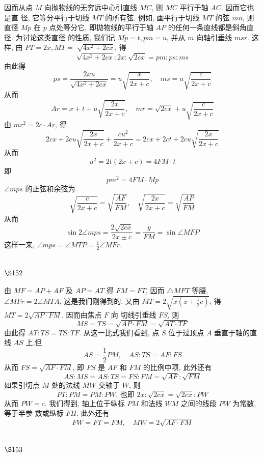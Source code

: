 因而从点 $M$ 向抛物线的无穷远中心引直线 $M C$, 则 $M C$ 平行于轴 $A C$. 因而它也是直 径, 它等分平行于切线 $M T$ 的所有弦. 例如, 画平行于切线 $M T$ 的弦 $m n$, 则直径 $M p$ 在 $p$ 点处等分它, 即拋物线的平行于轴 $A P$ 的任何一条直线都是斜角直径. 为讨论这类直径 的性质, 我们记 $M p=t, p m=u$, 并从 $m$ 向轴引垂线 $m s r$. 这样, 由 $P T=2 x, M T=$ $\sqrt{4 x^{2}+2 c x}$, 得
\[
\sqrt{4 x^{2}+2 c x}: 2 x: \sqrt{2 c x}=p m: p s: m s
\]
由此得
\[
p s=\frac{2 x u}{\sqrt{4 x^{2}+2 c x}}=u \sqrt{\frac{x}{2 x+c}}, \quad m s=u \sqrt{\frac{c}{2 x+c}}
\]
从而
\[
A r=x+t+u \sqrt{\frac{2 x}{2 x+c}}, \quad m r=\sqrt{2 c x}+u \sqrt{\frac{c}{2 x+c}}
\]
由 $m r^{2}=2 c \cdot A r$, 得
\[
2 c x+2 c u \sqrt{\frac{2 x}{2 x+c}}+\frac{c u^{2}}{2 x+c}=2 c x+2 c t+2 c u \sqrt{\frac{2 x}{2 x+c}}
\]
从而
\[
u^{2}=2 t(2 x+c)=4 F M \cdot t
\]
即
\[
p m^{2}=4 F M \cdot M p
\]
$\angle m p s$ 的正弦和余弦为
\[
\sqrt{\frac{c}{2 x+c}}=\sqrt{\frac{A F}{F M}}, \quad \sqrt{\frac{2 x}{2 x+c}}=\sqrt{\frac{A P}{F M}}
\]
从而
\[
\sin 2 \angle m p s=\frac{2 \sqrt{2 c x}}{2 x \pm c}=\frac{y}{F M}=\sin \angle M F P
\]
这样一来, $\angle m p s=\angle M T P=\frac{1}{2} \angle M F r$.

\section{$\S 152$}

由 $M F=A P+A F$ 及 $A P=A T$ 得 $F M=F T$, 因而 $\triangle M F T$ 等腰, $\angle M F r=2 \angle M T A$, 这是我们刚得到的. 又由 $M T=2 \sqrt{x\left(x+\frac{1}{2} c\right)}$, 得 $M T=2 \sqrt{A P \cdot F M}$. 因而由焦点 $F$ 向 切线引垂线 $F S$, 则
\[
M S=T S=\sqrt{A P \cdot F M}=\sqrt{A T \cdot T F}
\]
由此得 $A T: T S=T S: T F$. 从这一比式我们看到, 点 $S$ 位于过顶点 $A$ 垂直于轴的直线 $A S$ 上,但
\[
A S=\frac{1}{2} P M, \quad A S: T S=A F: F S
\]
从而 $F S=\sqrt{A F \cdot F M}$, 即 $F S$ 是 $A F$ 和 $F M$ 的比例中项, 此外还有
\[
A S: M S=A S: T S=F S: F M=\sqrt{A F}: \sqrt{F M}
\]
如果引切点 $M$ 处的法线 $M W$ 交轴于 $W$, 则
\[
P T: P M=P M: P W \text {, 也即 } 2 x: \sqrt{2 c x}=\sqrt{2 c x}: P W
\]
从而 $P W=c$. 我们得到, 轴上位于纵标 $P M$ 和法线 $W M$ 之间的线段 $P W$ 为常数, 等于半参 数或纵标 $F H$. 此外还有
\[
F W=F T=F M, \quad M W=2 \sqrt{A F \cdot F M}
\]
\section{$\S 153$}

